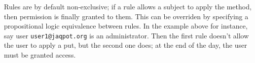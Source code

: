 Rules are by default non-exclusive; if a rule allows a subject to apply the method, 
then permission is finally granted to them. This can be overriden by specifying a 
propositional logic equivalence between rules. In the example above for instance, 
say user \texttt{user1@jaqpot.org} is an administrator. Then the first rule doesn't 
allow the user to apply a put, but the second one does; at the end of the day, the user 
must be granted access. 
